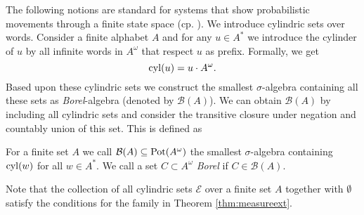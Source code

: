 The following notions are standard for systems that show probabilistic 
movements through a finite state space (cp. 
\cite{RandomnessForFree,AlgorithmsForPOSG}). We introduce cylindric sets over 
words. Consider a finite alphabet $A$ and for any $u\in A^{*}$ we introduce the 
cylinder of $u$ by all infinite words in $A^{\omega}$ that respect $u$ as 
prefix. Formally, we get
\begin{equation*}
  \operatorname{cyl}(u) = u\cdot A^{\omega}.
\end{equation*}
Based upon these cylindric sets we construct the smallest $\sigma$-algebra
containing all these sets  as \emph{Borel}-algebra (denoted by 
$\mathcal{B}(A)$). We can obtain $\mathcal{B}(A)$ by including all cylindric 
sets and consider the transitive closure under negation and countably union of 
this set. This is defined as
\begin{definition}
  For a finite set $A$ we call $\mathcal{B}(A)\subseteq\operatorname{Pot}(A^{\omega})$ the 
  smallest $\sigma$-algebra containing $\operatorname{cyl}(w)$ for all $w\in A^{*}$. We call
  a set $C\subset A^{\omega}$ \emph{Borel} if $C\in\mathcal{B}(A)$.
  \label{def:borelalgebra}
\end{definition}
Note that the collection of all cylindric sets $\mathcal{E}$ over a finite set
$A$ together with $\emptyset$ satisfy the conditions for the family in Theorem
\ref{thm:measureext}.

